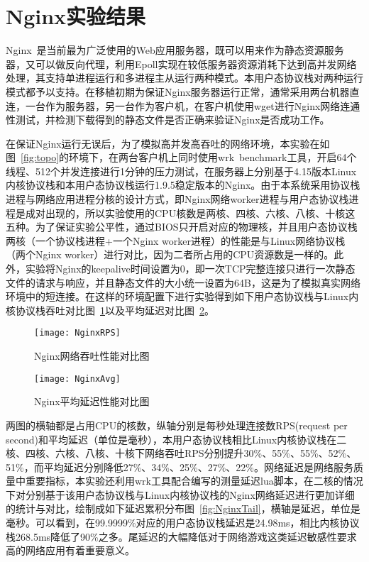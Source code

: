 \section{Nginx实验结果}
Nginx~\cite{Nginx}是当前最为广泛使用的Web应用服务器，既可以用来作为静态资源服务器，又可以做反向代理，利用Epoll实现在较低服务器资源消耗下达到高并发网络处理，其支持单进程运行和多进程主从运行两种模式。本用户态协议栈对两种运行模式都予以支持。在移植初期为保证Nginx服务器运行正常，通常采用两台机器直连，一台作为服务器，另一台作为客户机，在客户机使用wget进行Nginx网络连通性测试，并检测下载得到的静态文件是否正确来验证Nginx是否成功工作。

在保证Nginx运行无误后，为了模拟高并发高吞吐的网络环境，本实验在如图~\ref{fig:topo}的环境下，在两台客户机上同时使用wrk~\cite{wrk}benchmark工具，开启64个线程、512个并发连接进行1分钟的压力测试，在服务器上分别基于4.15版本Linux内核协议栈和本用户态协议栈运行1.9.5稳定版本的Nginx。由于本系统采用协议栈进程与网络应用进程分核的设计方式，即Nginx网络worker进程与用户态协议栈进程是成对出现的，所以实验使用的CPU核数是两核、四核、六核、八核、十核这五种。为了保证实验公平性，通过BIOS只开启对应的物理核，并且用户态协议栈两核（一个协议栈进程+一个Nginx worker进程）的性能是与Linux网络协议栈（两个Nginx worker）进行对比，因为二者所占用的CPU资源数是一样的。此外，实验将Nginx的keepalive时间设置为0，即一次TCP完整连接只进行一次静态文件的请求与响应，并且静态文件的大小统一设置为64B，这是为了模拟真实网络环境中的短连接。在这样的环境配置下进行实验得到如下用户态协议栈与Linux内核协议栈吞吐对比图~\ref{fig:NginxRPS}以及平均延迟对比图~\ref{fig:NginxAvg}。

\vspace{-10pt}
\begin{figure}[H] %
  \centering
  \texttt{[image: NginxRPS]}
  \caption{Nginx网络吞吐性能对比图}
  \label{fig:NginxRPS}
\end{figure}
\vspace{-10pt}

\vspace{-10pt}
\begin{figure}[H] %
  \centering
  \texttt{[image: NginxAvg]}
  \caption{Nginx平均延迟性能对比图}
  \label{fig:NginxAvg}
\end{figure}
\vspace{-10pt}

两图的横轴都是占用CPU的核数，纵轴分别是每秒处理连接数RPS(request per second)和平均延迟（单位是毫秒），本用户态协议栈相比Linux内核协议栈在二核、四核、六核、八核、十核下网络吞吐RPS分别提升30\%、55\%、55\%、52\%、51\%，而平均延迟分别降低27\%、34\%、25\%、27\%、22\%。网络延迟是网络服务质量中重要指标，本实验还利用wrk工具配合编写的测量延迟lua脚本，在二核的情况下对分别基于该用户态协议栈与Linux内核协议栈的Nginx网络延迟进行更加详细的统计与对比，绘制成如下延迟累积分布图~\ref{fig:NginxTail}，横轴是延迟，单位是毫秒。可以看到，在99.9999\%对应的用户态协议栈延迟是24.98ms，相比内核协议栈268.5ms降低了90\%之多。尾延迟的大幅降低对于网络游戏这类延迟敏感性要求高的网络应用有着重要意义。


